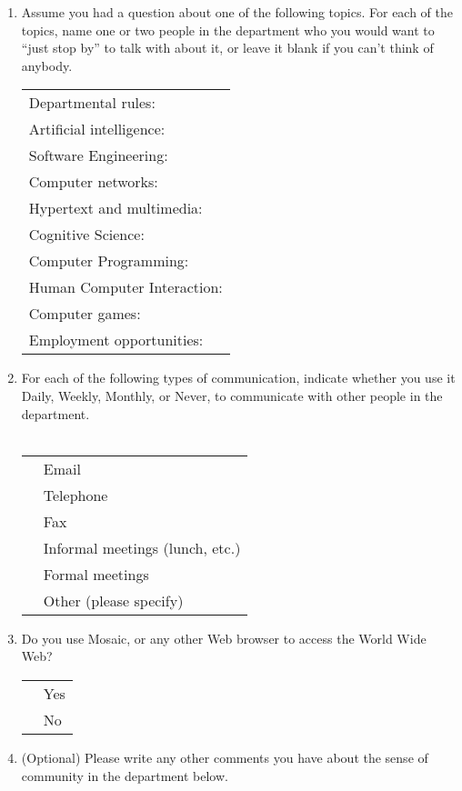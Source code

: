 \begin{enumerate}
\item{Assume you had a question about one of the following topics.  For
  each of the topics, name one or two people in the department who you
  would want to ``just stop by'' to talk with about it, or leave it blank
  if you can't think of anybody.}\\
  \begin{tabular}{l}
  Departmental rules: \\
  Artificial intelligence: \\
  Software Engineering: \\
  Computer networks: \\
  Hypertext and multimedia: \\
  Cognitive Science: \\
  Computer Programming: \\
  Human Computer Interaction: \\
  Computer games: \\
  Employment opportunities: \\
  \end{tabular}

\newpage
\item{For each of the following types of communication, indicate whether
  you use it Daily, Weekly, Monthly, or Never, to communicate with other
  people in the department.}\\
\\
  \begin{tabular}{ll}
    \underline{  }\underline{  }\underline{  }  & Email\\
    \underline{  }\underline{  }\underline{  }  & Telephone\\
    \underline{  }\underline{  }\underline{  }  & Fax\\
    \underline{  }\underline{  }\underline{  }  & Informal meetings (lunch, etc.)\\
    \underline{  }\underline{  }\underline{  }  & Formal meetings\\
    \underline{  }\underline{  }\underline{  }  & Other (please specify)\\
  \end{tabular}

\item{Do you use Mosaic, or any other Web browser to access the World Wide
  Web?}\\
  \begin{tabular}{ll}
  \underline{  }\underline{  }\underline{  }  & Yes\\
  \underline{  }\underline{  }\underline{  }  & No\\
  \end{tabular}

\item{(Optional) Please write any other comments you have about the sense
  of community in the department below.}
\\ \\ \\ \\ \\
\end{enumerate}

